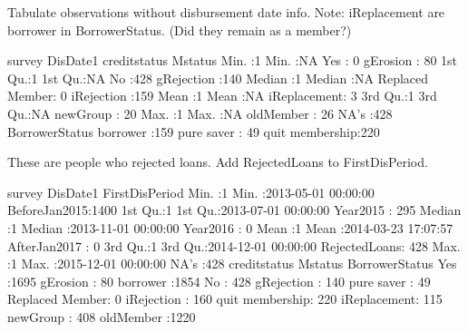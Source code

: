 Tabulate observations without disbursement date info. Note: \textsf{iReplacement} are borrower in \textsf{BorrowerStatus}. (Did they remain as a member?)
\begin{Schunk}
\begin{Soutput}
     survey     DisDate1            creditstatus         Mstatus   
 Min.   :1   Min.   :NA    Yes            :  0   gErosion    : 80  
 1st Qu.:1   1st Qu.:NA    No             :428   gRejection  :140  
 Median :1   Median :NA    Replaced Member:  0   iRejection  :159  
 Mean   :1   Mean   :NA                          iReplacement:  3  
 3rd Qu.:1   3rd Qu.:NA                          newGroup    : 20  
 Max.   :1   Max.   :NA                          oldMember   : 26  
             NA's   :428                                           
         BorrowerStatus
 borrower       :159   
 pure saver     : 49   
 quit membership:220   
                       
                       
                       
                       
\end{Soutput}
\end{Schunk}
These are people who rejected loans. Add \textsf{RejectedLoans} to \textsf{FirstDisPeriod}. \gobblepars
\begin{Schunk}
\begin{Soutput}
     survey     DisDate1                         FirstDisPeriod
 Min.   :1   Min.   :2013-05-01 00:00:00   BeforeJan2015:1400  
 1st Qu.:1   1st Qu.:2013-07-01 00:00:00   Year2015     : 295  
 Median :1   Median :2013-11-01 00:00:00   Year2016     :   0  
 Mean   :1   Mean   :2014-03-23 17:07:57   AfterJan2017 :   0  
 3rd Qu.:1   3rd Qu.:2014-12-01 00:00:00   RejectedLoans: 428  
 Max.   :1   Max.   :2015-12-01 00:00:00                       
             NA's   :428                                       
          creditstatus          Mstatus             BorrowerStatus
 Yes            :1695   gErosion    :  80   borrower       :1854  
 No             : 428   gRejection  : 140   pure saver     :  49  
 Replaced Member:   0   iRejection  : 160   quit membership: 220  
                        iReplacement: 115                         
                        newGroup    : 408                         
                        oldMember   :1220                         
                                                                  
\end{Soutput}
\end{Schunk}

